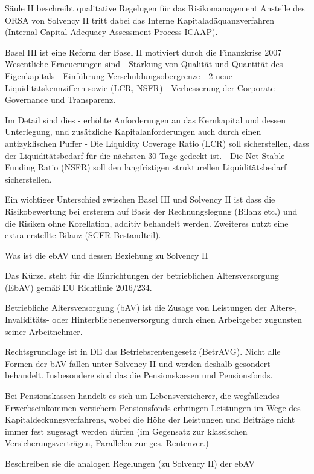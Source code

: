 Säule II beschreibt qualitative Regelugen für das Risikomanagement
Anstelle des ORSA von Solvency II tritt dabei das 
Interne Kapitaladäquanzverfahren (Internal Capital Adequacy Assessment Process ICAAP).

Basel III ist eine Reform der Basel II motiviert durch die Finanzkrise 2007
Wesentliche Erneuerungen sind
- Stärkung von Qualität und Quantität des Eigenkapitals
- Einführung Verschuldungsobergrenze 
- 2 neue Liquiditätskennziffern sowie (LCR, NSFR)
- Verbesserung der Corporate Governance und Transparenz.

Im Detail sind dies 
- erhöhte Anforderungen an das Kernkapital und dessen Unterlegung, 
und zusätzliche Kapitalanforderungen auch durch einen antizyklischen Puffer
- Die Liquidity Coverage Ratio (LCR) soll sicherstellen, dass der Liquiditätsbedarf für die nächsten 30 Tage
gedeckt ist. 
- Die Net Stable Funding Ratio (NSFR) soll den langfristigen strukturellen Liquiditätsbedarf sicherstellen.

Ein wichtiger Unterschied zwischen Basel III und Solvency II ist dass die Risikobewertung bei ersterem
auf Basis der Rechnungslegung (Bilanz etc.) und die Risiken ohne Korellation, additiv behandelt werden.
Zweiteres nutzt eine extra erstellte Bilanz (SCFR Bestandteil).



Was ist die ebAV und dessen Beziehung zu Solvency II 

Das Kürzel steht für die Einrichtungen der betrieblichen Altersversorgung (EbAV)
gemäß EU Richtlinie 2016/234.

Betriebliche Altersversorgung (bAV) ist die Zusage von Leistungen der 
Alters-, Invaliditäts- oder Hinterbliebenenversorgung 
durch einen Arbeitgeber zugunsten seiner Arbeitnehmer.

Rechtsgrundlage ist in DE das Betriebsrentengesetz (BetrAVG).
Nicht alle Formen der bAV fallen unter Solvency II und werden deshalb gesondert behandelt. 
Insbesondere sind das die Pensionskassen und Pensionsfonds.

Bei Pensionskassen handelt es sich um Lebensversicherer, die wegfallendes Erwerbseinkommen versichern
Pensionsfonds erbringen Leistungen im Wege des Kapitaldeckungsverfahrens, wobei die Höhe der Leistungen und Beiträge
nicht immer fest zugesagt werden dürfen (im Gegensatz zur klassischen Versicherungsverträgen, Parallelen zur ges. Rentenver.)



Beschreiben sie die analogen Regelungen (zu Solvency II) der ebAV 

